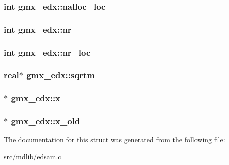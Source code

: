 \hypertarget{structgmx__edx_a8cced363379cca57baff252e5ba2cdf4}{
\subsubsection[{nalloc\-\_\-loc}]{\setlength{\rightskip}{0pt plus 5cm}int {\bf gmx\-\_\-edx\-::nalloc\-\_\-loc}}}\label{structgmx__edx_a8cced363379cca57baff252e5ba2cdf4}
\hypertarget{structgmx__edx_abc3897fbe59e56cf815b6fe48a57d511}{
\subsubsection[{nr}]{\setlength{\rightskip}{0pt plus 5cm}int {\bf gmx\-\_\-edx\-::nr}}}\label{structgmx__edx_abc3897fbe59e56cf815b6fe48a57d511}
\hypertarget{structgmx__edx_a6a29f93a9eedc6ca6bdf9e3ec97f9ef4}{
\subsubsection[{nr\-\_\-loc}]{\setlength{\rightskip}{0pt plus 5cm}int {\bf gmx\-\_\-edx\-::nr\-\_\-loc}}}\label{structgmx__edx_a6a29f93a9eedc6ca6bdf9e3ec97f9ef4}
\hypertarget{structgmx__edx_ae55ad4c2c4527dd18ab12d05ddd9d37a}{
\subsubsection[{sqrtm}]{\setlength{\rightskip}{0pt plus 5cm}real$\ast$ {\bf gmx\-\_\-edx\-::sqrtm}}}\label{structgmx__edx_ae55ad4c2c4527dd18ab12d05ddd9d37a}
\hypertarget{structgmx__edx_a7db9a3b1ee8482cdc0ece1db3699ec7c}{
\subsubsection[{x}]{$\ast$ {\bf gmx\-\_\-edx\-::x}}}\label{structgmx__edx_a7db9a3b1ee8482cdc0ece1db3699ec7c}
\hypertarget{structgmx__edx_aad198cc809f55ae2e8a3735a9ad6a59f}{
\subsubsection[{x\-\_\-old}]{$\ast$ {\bf gmx\-\_\-edx\-::x\-\_\-old}}}\label{structgmx__edx_aad198cc809f55ae2e8a3735a9ad6a59f}


\-The documentation for this struct was generated from the following file\-:\begin{DoxyCompactItemize}
\item 
src/mdlib/\hyperlink{edsam_8c}{edsam.\-c}\end{DoxyCompactItemize}
